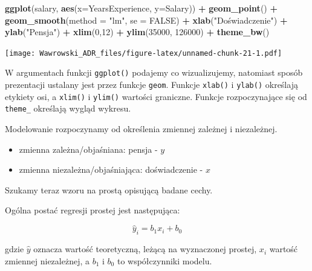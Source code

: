 \documentclass[
]{book}
\newenvironment{Shaded}{\begin{snugshade}}{\end{snugshade}}
\newcommand{\DataTypeTok}[1]{\textcolor[rgb]{0.13,0.29,0.53}{#1}}
\newcommand{\DecValTok}[1]{\textcolor[rgb]{0.00,0.00,0.81}{#1}}
\newcommand{\KeywordTok}[1]{\textcolor[rgb]{0.13,0.29,0.53}{\textbf{#1}}}
\newcommand{\NormalTok}[1]{#1}
\newcommand{\OperatorTok}[1]{\textcolor[rgb]{0.81,0.36,0.00}{\textbf{#1}}}
\newcommand{\OtherTok}[1]{\textcolor[rgb]{0.56,0.35,0.01}{#1}}
\newcommand{\StringTok}[1]{\textcolor[rgb]{0.31,0.60,0.02}{#1}}
\providecommand{\tightlist}{%
  \setlength{\itemsep}{0pt}\setlength{\parskip}{0pt}}
\begin{document}
\begin{Shaded}
\begin{Highlighting}[]
\KeywordTok{ggplot}\NormalTok{(salary, }\KeywordTok{aes}\NormalTok{(}\DataTypeTok{x=}\NormalTok{YearsExperience, }\DataTypeTok{y=}\NormalTok{Salary)) }\OperatorTok{+}\StringTok{ }
\StringTok{  }\KeywordTok{geom_point}\NormalTok{() }\OperatorTok{+}
\StringTok{  }\KeywordTok{geom_smooth}\NormalTok{(}\DataTypeTok{method =} \StringTok{"lm"}\NormalTok{, }\DataTypeTok{se =} \OtherTok{FALSE}\NormalTok{) }\OperatorTok{+}
\StringTok{  }\KeywordTok{xlab}\NormalTok{(}\StringTok{"Doświadczenie"}\NormalTok{) }\OperatorTok{+}\StringTok{ }
\StringTok{  }\KeywordTok{ylab}\NormalTok{(}\StringTok{"Pensja"}\NormalTok{) }\OperatorTok{+}
\StringTok{  }\KeywordTok{xlim}\NormalTok{(}\DecValTok{0}\NormalTok{,}\DecValTok{12}\NormalTok{) }\OperatorTok{+}
\StringTok{  }\KeywordTok{ylim}\NormalTok{(}\DecValTok{35000}\NormalTok{, }\DecValTok{126000}\NormalTok{) }\OperatorTok{+}
\StringTok{  }\KeywordTok{theme_bw}\NormalTok{()}
\end{Highlighting}
\end{Shaded}

\texttt{[image: Wawrowski\_ADR\_files/figure-latex/unnamed-chunk-21-1.pdf]}

W argumentach funkcji \texttt{ggplot()} podajemy co wizualizujemy, natomiast sposób prezentacji ustalany jest przez funkcje \texttt{geom}. Funkcje \texttt{xlab()} i \texttt{ylab()} określają etykiety osi, a \texttt{xlim()} i \texttt{ylim()} wartości graniczne. Funkcje rozpoczynające się od \texttt{theme\_} określają wygląd wykresu.

Modelowanie rozpoczynamy od określenia zmiennej zależnej i niezależnej.

\begin{itemize}
\tightlist
\item
  zmienna zależna/objaśniana: pensja - \(y\)
\item
  zmienna niezależna/objaśniająca: doświadczenie - \(x\)
\end{itemize}

Szukamy teraz wzoru na prostą opisującą badane cechy.

Ogólna postać regresji prostej jest następująca:

\[\hat{y}_{i}=b_{1}x_{i}+b_{0}\]

gdzie \(\hat{y}\) oznacza wartość teoretyczną, leżącą na wyznaczonej prostej, \(x_i\) wartość zmiennej niezależnej, a \(b_1\) i \(b_0\) to współczynniki modelu.
\end{document}

